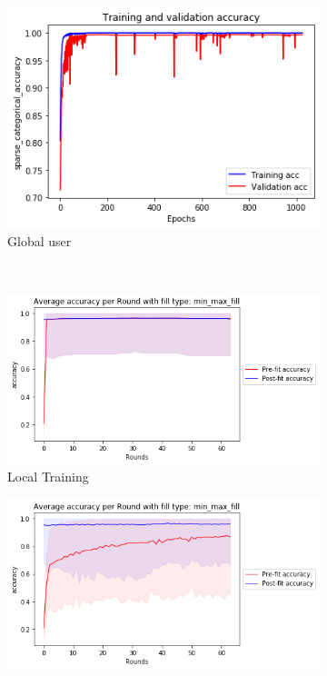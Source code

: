 \documentclass[12pt]{article}
\begin{document}
\begin{figure}[H]
\centering
\begin{subfigure}{0.45\textwidth}
    \centering
    \includegraphics[width=\textwidth]{resources/posture_global_stdsplit-accuracy.png}
    \caption{Global user}
    \label{fig:posture_graphs:global}
\end{subfigure}%
\\
\begin{subfigure}{0.45\textwidth}
    \includegraphics[width=\textwidth]{resources/posture_localround-stdsplit-accuracy.png}
    \raggedleft
    \caption{Local Training}
    \label{fig:posture_graphs:local}
\end{subfigure}
\begin{subfigure}{0.45\textwidth}
    \raggedleft
    \includegraphics[width=\textwidth]{resources/posture_centralround-stdsplit-accuracy.png}

\end{subfigure}
\end{figure}
\end{document}
